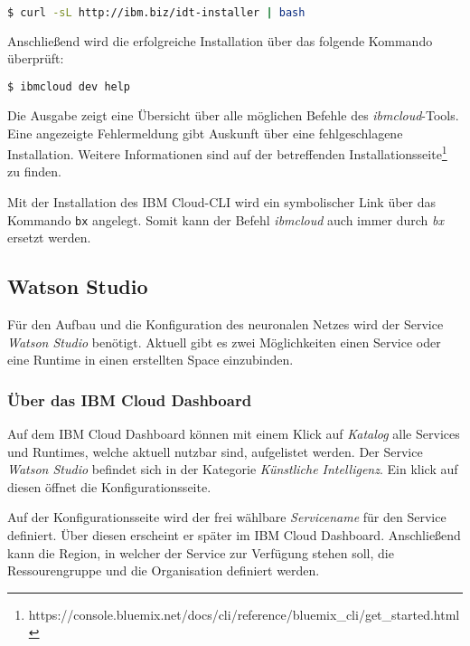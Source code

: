 \begin{lstlisting}[language=bash, caption=Installation des IBM Cloud CLI, label=Installation des IBM Cloud CLI]
    $ curl -sL http://ibm.biz/idt-installer | bash
\end{lstlisting}

Anschließend wird die erfolgreiche Installation über das folgende Kommando überprüft:

\begin{lstlisting}[language=bash, caption=Installation des CLI überprüfen, label=Installation des CLI überprüfen]
    $ ibmcloud dev help
\end{lstlisting}

Die Ausgabe zeigt eine Übersicht über alle möglichen Befehle des \textit{ibmcloud}-Tools. Eine angezeigte Fehlermeldung
gibt Auskunft über eine fehlgeschlagene Installation. Weitere Informationen sind auf der betreffenden
Installationsseite\footnote{https://console.bluemix.net/docs/cli/reference/bluemix\_cli/get\_started.html} zu finden.

Mit der Installation des IBM Cloud-CLI wird ein symbolischer Link über das Kommando \texttt{bx} angelegt. Somit kann der
Befehl \textit{ibmcloud} auch immer durch \textit{bx} ersetzt werden.

\subsection{Watson Studio}
Für den Aufbau und die Konfiguration des neuronalen Netzes wird der Service \textit{Watson Studio} benötigt. Aktuell gibt
es zwei Möglichkeiten einen Service oder eine Runtime in einen erstellten Space einzubinden.

\subsubsection*{Über das IBM Cloud Dashboard}
Auf dem IBM Cloud Dashboard können mit einem Klick auf \textit{Katalog} alle Services und Runtimes, welche aktuell nutzbar
sind, aufgelistet werden. Der Service \textit{Watson Studio} befindet sich in der Kategorie
\textit{Künstliche Intelligenz}. Ein klick auf diesen öffnet die Konfigurationsseite.

Auf der Konfigurationsseite wird der frei wählbare \textit{Servicename} für den Service definiert. Über diesen erscheint
er später im IBM Cloud Dashboard. Anschließend kann die Region, in welcher der Service zur Verfügung stehen soll, die
Ressourengruppe und die Organisation definiert werden.

